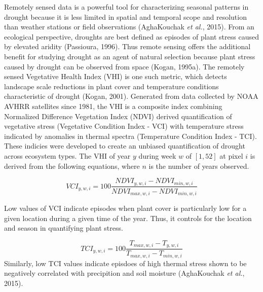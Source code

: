 \documentclass[man,floatsintext]{apa6}
\theoremstyle{definition}
\theoremstyle{definition}
\theoremstyle{definition}
\theoremstyle{remark}
\begin{document}
Remotely sensed data is a powerful tool for characterizing seasonal
patterns in drought because it is less limited in spatial and temporal
scope and resolution than weather stations or field observations
(AghaKouchak \emph{et al.}, 2015). From an ecological perspective,
droughts are best defined as episodes of plant stress caused by elevated
aridity (Passioura, 1996). Thus remote sensing offers the additional
benefit for studying drought as an agent of natural selection because
plant stress caused by drought can be observed from space (Kogan,
1995a). The remotely sensed Vegetative Health Index (VHI) is one such
metric, which detects landscape scale reductions in plant cover and
temperature conditions characteristic of drought (Kogan, 2001).
Generated from data collected by NOAA AVHRR satellites since 1981, the
VHI is a composite index combining Normalized Difference Vegetation
Index (NDVI) derived quantification of vegetative stress (Vegetative
Condition Index - VCI) with temperature stress indicated by anomalies in
thermal spectra (Temperature Condition Index - TCI). These indicies were
developed to create an unbiased quantification of drought across
ecosystem types. The VHI of year \(y\) during week \(w\) of \([1,52]\)
at pixel \(i\) is derived from the following equations, where \(n\) is
the number of years observed.

\[VCI_{y,w,i} = 100\frac{NDVI_{y,w,i} - NDVI_{min,w,i}}{NDVI_{max,w,i} - NDVI_{min,w,i}}\]

Low values of VCI indicate episodes when plant cover is particularly low
for a given location during a given time of the year. Thus, it controls
for the location and season in quantifying plant stress.

\[TCI_{y,w,i} = 100\frac{T_{max,w,i}-T_{y,w,i}}{T_{max,w,i} - T_{min,w,i}}\]
Similarly, low TCI values indicate episdoes of high thermal stress shown
to be negatively correlated with precipition and soil moisture
(AghaKouchak \emph{et al.}, 2015).
\end{document}
